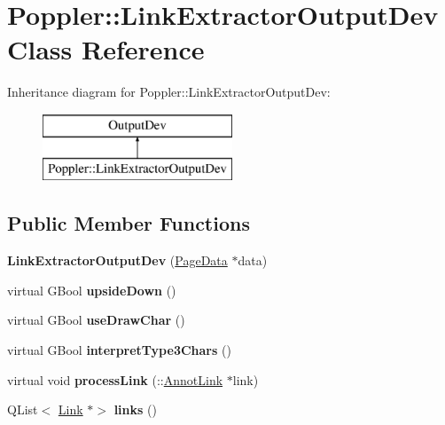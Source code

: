 \hypertarget{class_poppler_1_1_link_extractor_output_dev}{}\section{Poppler\+:\+:Link\+Extractor\+Output\+Dev Class Reference}
\label{class_poppler_1_1_link_extractor_output_dev}
Inheritance diagram for Poppler\+:\+:Link\+Extractor\+Output\+Dev\+:\begin{figure}[H]
\begin{center}
\leavevmode
\includegraphics[height=2.000000cm]{class_poppler_1_1_link_extractor_output_dev}
\end{center}
\end{figure}
\subsection*{Public Member Functions}
\begin{DoxyCompactItemize}
\item 
\mbox{\label{class_poppler_1_1_link_extractor_output_dev_a41cb8088211cb5c05328a0bab18b1d7d}} 
{\bfseries Link\+Extractor\+Output\+Dev} (\hyperlink{class_poppler_1_1_page_data}{Page\+Data} $\ast$data)
\item 
\mbox{\label{class_poppler_1_1_link_extractor_output_dev_ab25194b7e7e7fe59b76701e28537bc05}} 
virtual G\+Bool {\bfseries upside\+Down} ()
\item 
\mbox{\label{class_poppler_1_1_link_extractor_output_dev_af5c9c21a7ba6986f3bd674303fff1c7c}} 
virtual G\+Bool {\bfseries use\+Draw\+Char} ()
\item 
\mbox{\label{class_poppler_1_1_link_extractor_output_dev_ae6da026acf4593e092064d5e1fa75123}} 
virtual G\+Bool {\bfseries interpret\+Type3\+Chars} ()
\item 
\mbox{\label{class_poppler_1_1_link_extractor_output_dev_a43cb81a3f9227eb9015a94bce10ef908}} 
virtual void {\bfseries process\+Link} (\+::\hyperlink{class_annot_link}{Annot\+Link} $\ast$link)
\item 
\mbox{\label{class_poppler_1_1_link_extractor_output_dev_a83ca7f7670e647efc56d71c06a63d13e}} 
Q\+List$<$ \hyperlink{class_poppler_1_1_link}{Link} $\ast$$>$ {\bfseries links} ()
\end{DoxyCompactItemize}


